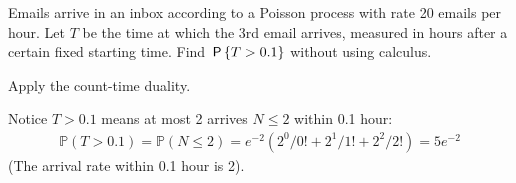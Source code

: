 

\setcounter{theorem}{44}
\begin{exercise}[BH.5.45] Emails arrive in an inbox according to a Poisson process with rate 20 emails per hour. Let $T$ be the time at which the 3rd email arrives, measured in hours after a certain fixed starting time. Find $\P{T > 0.1}$ without using calculus.
    \begin{hint}
        Apply the count-time duality.
    \end{hint}
\begin{solution}
    Notice $T>0.1$ means at most 2 arrives $N\leq 2$  within 0.1 hour:
	\begin{align*}
		\mathbb{P}(T>0.1) = \mathbb{P}(N\leq 2) = e^{-2}\left(2^0/0!+2^1/1!+2^2/2! \right)=5e^{-2}
	\end{align*}
	(The arrival rate within 0.1 hour is 2).
\end{solution}
\end{exercise}


